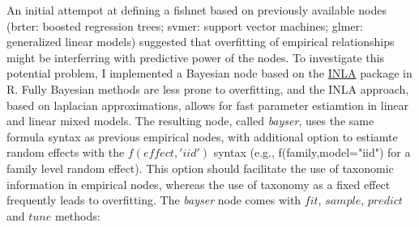\documentclass{dragonfly-report}\usepackage[]{graphicx}\usepackage[]{color}
\begin{document}
An initial attempot at defining a fishnet based on previously available nodes (brter: boosted regression trees; svmer: support vector machines; glmer: generalized linear models) suggested that overfitting of empirical relationships might be interferring with predictive power of the nodes. To investigate this potential problem, I implemented a Bayesian node based on the \href{http://www.r-inla.org/}{INLA} package in R. Fully Bayesian methods are less prone to overfitting, and the INLA approach, based on laplacian approximations, allows for fast parameter estiamtion in linear and linear mixed models. The resulting node, called \emph{bayser}, uses the same formula syntax as previous empirical nodes, with additional option to estiamte random effects with the $f(effect, 'iid')$ syntax (e.g., f(family,model="iid") for a family level random effect). This option should facilitate the use of taxonomic information in empirical nodes, whereas the use of taxonomy as a fixed effect frequently leads to overfitting. The \emph{bayser} node comes with $fit$, $sample$, $predict$ and $tune$ methods:
\end{document}
